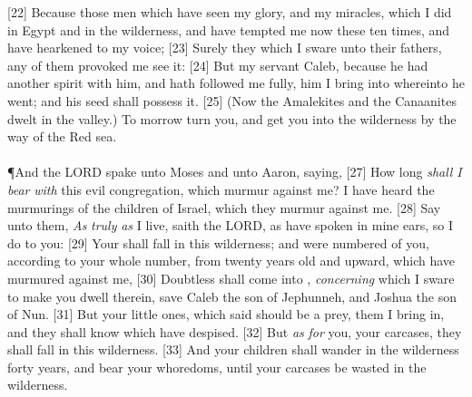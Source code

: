 [22] \textcolor[cmyk]{0.99998,1,0,0}{Because  those men which have seen my glory, and my miracles, which I did in Egypt and in the wilderness, and have tempted me now these ten times, and have  hearkened to my voice;}
[23] \textcolor[cmyk]{0.99998,1,0,0}{Surely they   which I sware unto their fathers,  any of them   provoked me see it:}
[24] \textcolor[cmyk]{0.99998,1,0,0}{But my servant Caleb, because he had another spirit with him, and hath followed me fully, him  I bring into  whereinto he went; and his seed shall possess it.}
[25] \textcolor[cmyk]{0.99998,1,0,0}{(Now the Amalekites and the Canaanites dwelt in the valley.) To morrow turn you, and get you into the wilderness by the way of the Red sea.}\\
\\
\P \textcolor[cmyk]{0.99998,1,0,0}{And the LORD spake unto Moses and unto Aaron, saying,}
[27] \textcolor[cmyk]{0.99998,1,0,0}{How long \emph{shall} \emph{I} \emph{bear} \emph{with} this evil congregation, which murmur against me? I have heard the murmurings of the children of Israel, which they murmur against me.}
[28] \textcolor[cmyk]{0.99998,1,0,0}{Say unto them, \emph{As} \emph{truly} \emph{as} I live, saith the LORD, as  have spoken in mine ears, so  I do to you:}
[29] \textcolor[cmyk]{0.99998,1,0,0}{Your  shall fall in this wilderness; and    were numbered of you, according to your whole number, from twenty years old and upward, which have murmured against me,}
[30] \textcolor[cmyk]{0.99998,1,0,0}{Doubtless  shall  come into , \emph{concerning} which I sware to make you dwell therein, save Caleb the son of Jephunneh, and Joshua the son of Nun.}
[31] \textcolor[cmyk]{0.99998,1,0,0}{But your little ones, which  said should be a prey, them  I bring in, and they shall know  which  have despised.}
[32] \textcolor[cmyk]{0.99998,1,0,0}{But \emph{as} \emph{for} you, your carcases, they shall fall in this wilderness.}
[33] \textcolor[cmyk]{0.99998,1,0,0}{And your children shall wander in the wilderness forty years, and bear your whoredoms, until your carcases be wasted in the wilderness.}
